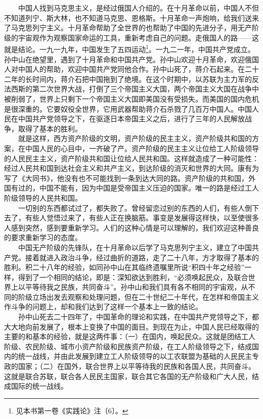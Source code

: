 \documentclass[cn,11pt,chinese]{elegantbook}
\begin{document}
　　中国人找到马克思主义，是经过俄国人介绍的。在十月革命以前，中国人不但不知道列宁、斯大林，也不知道马克思、恩格斯。十月革命一声炮响，给我们送来了马克思列宁主义。十月革命帮助了全世界的也帮助了中国的先进分子，用无产阶级的宇宙观作为观察国家命运的工具，重新考虑自己的问题。走俄国人的路——这就是结论。一九一九年，中国发生了五四运动\footnote[8]{ 见本书第一卷《实践论》注〔6〕。}。一九二一年，中国共产党成立。孙中山在绝望里，遇到了十月革命和中国共产党。孙中山欢迎十月革命，欢迎俄国人对中国人的帮助，欢迎中国共产党同他合作。孙中山死了，蒋介石起来。在二十二年的长时间内，蒋介石把中国拖到了绝境。在这个时期中，以苏联为主力军的反法西斯的第二次世界大战，打倒了三个帝国主义大国，两个帝国主义大国在战争中被削弱了，世界上只剩下一个帝国主义大国即美国没有受损失。而美国的国内危机是很深重的。它要奴役全世界，它用武器帮助蒋介石杀戮了几百万中国人。中国人民在中国共产党领导之下，在驱逐日本帝国主义之后，进行了三年的人民解放战争，取得了基本的胜利。\\
　　就是这样，西方资产阶级的文明，资产阶级的民主主义，资产阶级共和国的方案，在中国人民的心目中，一齐破了产。资产阶级的民主主义让位给工人阶级领导的人民民主主义，资产阶级共和国让位给人民共和国。这样就造成了一种可能性：经过人民共和国到达社会主义和共产主义，到达阶级的消灭和世界的大同。康有为写了《大同书》，他没有也不可能找到一条到达大同的路。资产阶级的共和国，外国有过的，中国不能有，因为中国是受帝国主义压迫的国家。唯一的路是经过工人阶级领导的人民共和国。\\
　　一切别的东西都试过了，都失败了。曾经留恋过别的东西的人们，有些人倒下去了，有些人觉悟过来了，有些人正在换脑筋。事变是发展得这样快，以至使很多人感到突然，感到要重新学习。人们的这种心情是可以理解的，我们欢迎这种善良的要求重新学习的态度。\\
　　中国无产阶级的先锋队，在十月革命以后学了马克思列宁主义，建立了中国共产党。接着就进入政治斗争，经过曲折的道路，走了二十八年，方才取得了基本的胜利。积二十八年的经验，如同孙中山在其临终遗嘱里所说“积四十年之经验”一样，得到了一个相同的结论，即是：深知欲达到胜利，“必须唤起民众，及联合世界上以平等待我之民族，共同奋斗”。孙中山和我们具有各不相同的宇宙观，从不同的阶级立场出发去观察和处理问题，但在二十世纪二十年代，在怎样和帝国主义作斗争的问题上，却和我们达到了这样一个基本上一致的结论。\\
　　孙中山死去二十四年了，中国革命的理论和实践，在中国共产党领导之下，都大大地向前发展了，根本上变换了中国的面目。到现在为止，中国人民已经取得的主要的和基本的经验，就是这两件事：（一）在国内，唤起民众。这就是团结工人阶级、农民阶级、城市小资产阶级和民族资产阶级，在工人阶级领导之下，结成国内的统一战线，并由此发展到建立工人阶级领导的以工农联盟为基础的人民民主专政的国家；（二）在国外，联合世界上以平等待我的民族和各国人民，共同奋斗。这就是联合苏联，联合各人民民主国家，联合其它各国的无产阶级和广大人民，结成国际的统一战线。\\
\end{document}
